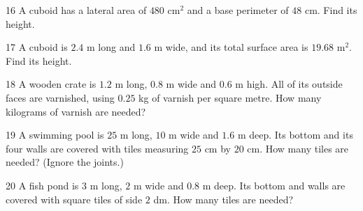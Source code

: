 \gap
\begin{probbox}{16}{\relax}
A cuboid has a lateral area of $480$ cm$^2$ and a base perimeter of $48$ cm. Find its height.
\end{probbox}
\gap
\begin{probbox}{17}{\relax}
A cuboid is $2.4$ m long and $1.6$ m wide, and its total surface area is $19.68$ m$^2$. Find its height.
\end{probbox}
\gap
\begin{probbox}{18}{\relax}
A wooden crate is $1.2$ m long, $0.8$ m wide and $0.6$ m high. All of its outside faces are varnished, using $0.25$ kg of varnish per square metre. How many kilograms of varnish are needed?
\end{probbox}
\gap
\begin{probbox}{19}{\relax}
A swimming pool is $25$ m long, $10$ m wide and $1.6$ m deep. Its bottom and its four walls are covered with tiles measuring $25$ cm by $20$ cm. How many tiles are needed? (Ignore the joints.)
\end{probbox}
\gap
\begin{probbox}{20}{\relax}
A fish pond is $3$ m long, $2$ m wide and $0.8$ m deep. Its bottom and walls are covered with square tiles of side $2$ dm. How many tiles are needed?
\end{probbox}
